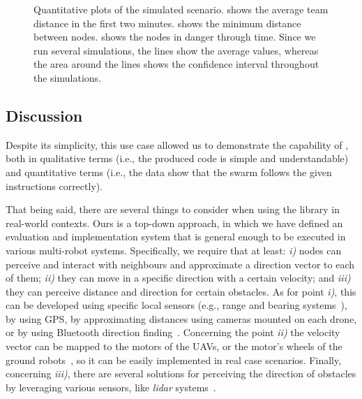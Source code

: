\begin{figure}[t]
\begin{subfigure}{0.4\textwidth}
  \caption{}
  \label{coordination2023-macro:fig:danger}
\end{subfigure}
\caption[Quantitative plots of the simulated scenario in \MacroSwarm{}.]{
  Quantitative plots of the simulated scenario. 
   shows the average team distance in the first two minutes. 
   shows the minimum distance between nodes. 
   shows the nodes in danger through time. 
  Since we run several simulations, 
   the lines show the average values, whereas 
   the area around the lines shows the confidence interval throughout the simulations.
}\label{coordination2023-macro:fig:results}
\end{figure}

\subsection{Discussion}\label{coordination2023-macro:subsec:discussion}
%
Despite its simplicity, 
this use case allowed us to demonstrate the capability of \MacroSwarm{}, both in qualitative terms (i.e., the produced code is simple and understandable) and quantitative terms (i.e., the data show that the swarm follows the given instructions correctly).

That being said, there are several things to consider when using the library in real-world contexts. Ours is a top-down approach, in which we have defined an evaluation and implementation system that is general enough to be executed in various multi-robot systems. Specifically, we require that at least: 
\emph{i)} nodes can perceive and interact with neighbours and approximate a direction vector to each of them; 
\emph{ii)} they can move in a specific direction with a certain velocity; and 
\emph{iii)} they can perceive distance and direction for certain obstacles.
%
As for point \emph{i)}, this can be developed using specific local sensors (e.g., range and bearing systems~\cite{DBLP:conf/antsw/BilalogluSAST22}), by using GPS, by approximating distances using cameras mounted on each drone, or by using Bluetooth direction finding~\cite{DBLP:conf/wcnc/SambuW22}.
% 
Concerning the point \emph{ii)} the velocity vector can be mapped to the motors of the UAVs, or the motor's wheels of the ground robots~\cite{DBLP:conf/icra/KorenB91}, so it can be easily implemented in real case scenarios.
%
Finally, concerning \emph{iii)}, there are several solutions for perceiving the direction of obstacles by leveraging various sensors, like \emph{\ac{lidar}} systems~\cite{DBLP:conf/icinfa/PengQZXLG15}.

